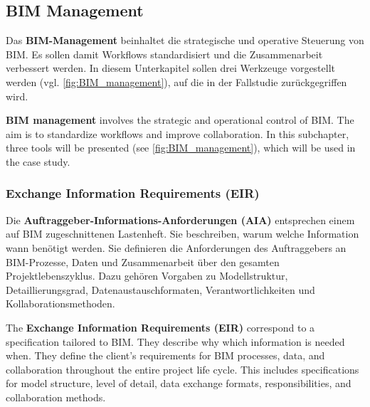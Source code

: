 \subsection{BIM Management}
\begin{German}
    Das \textbf{BIM-Management} beinhaltet die strategische und operative Steuerung von BIM. Es sollen damit Workflows standardisiert und die Zusammenarbeit verbessert werden. In diesem Unterkapitel sollen drei Werkzeuge vorgestellt werden (vgl. \ref{fig:BIM_management}), auf die in der Fallstudie zurückgegriffen wird.
\end{German}
\begin{English}
    \textbf{BIM management} involves the strategic and operational control of BIM. The aim is to standardize workflows and improve collaboration. In this subchapter, three tools will be presented (see \ref{fig:BIM_management}), which will be used in the case study.
\end{English}

\subsubsection{Exchange Information Requirements (EIR)}
\begin{German}
    Die \textbf{Auftraggeber-Informations-Anforderungen (AIA)} entsprechen einem auf BIM zugeschnittenen Lastenheft. Sie beschreiben, warum welche Information wann benötigt werden. Sie definieren die Anforderungen des Auftraggebers an BIM-Prozesse, Daten und Zusammenarbeit über den gesamten Projektlebenszyklus. Dazu gehören Vorgaben zu Modellstruktur, Detaillierungsgrad, Datenaustauschformaten, Verantwortlichkeiten und Kollaborationsmethoden. \cite{astourLehrbuchGrundlagenBIMArbeitsmethode2022}
\end{German}
\begin{English}
    The \textbf{Exchange Information Requirements (EIR)} correspond to a specification tailored to BIM. They describe why which information is needed when. They define the client's requirements for BIM processes, data, and collaboration throughout the entire project life cycle. This includes specifications for model structure, level of detail, data exchange formats, responsibilities, and collaboration methods. \cite{astourLehrbuchGrundlagenBIMArbeitsmethode2022}
\end{English}

